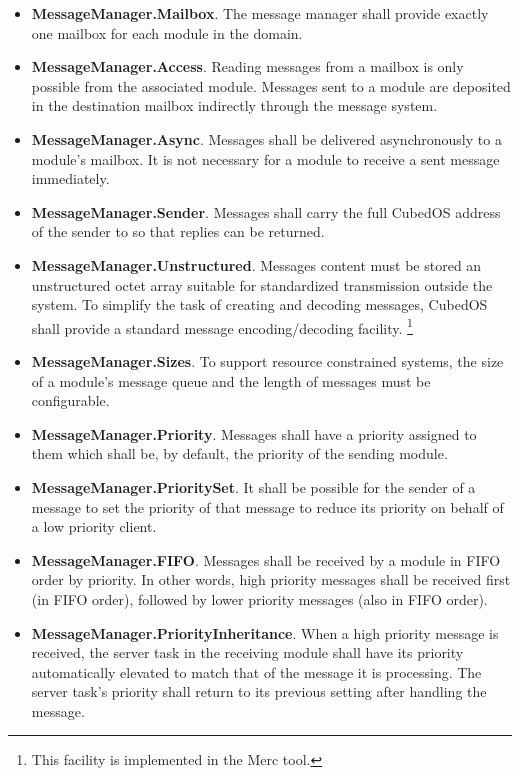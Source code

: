 \begin{itemize}
\item \textbf{MessageManager.Mailbox}. The message manager shall provide exactly one mailbox for
  each module in the domain.
\item \textbf{MessageManager.Access}. Reading messages from a mailbox is only possible from the associated module. Messages sent to a module are deposited in the destination mailbox indirectly through the message system.
\item \textbf{MessageManager.Async}. Messages shall be delivered asynchronously to a module's
  mailbox. It is not necessary for a module to receive a sent message immediately.
\item \textbf{MessageManager.Sender}. Messages shall carry the full CubedOS address of the
  sender to so that replies can be returned.
\item \textbf{MessageManager.Unstructured}. Messages content must be stored an unstructured octet array suitable for standardized transmission outside the system. To simplify the task of creating and
  decoding messages, CubedOS shall provide a standard message encoding/decoding facility.
  \footnote{This facility is implemented in the Merc tool.}
\item \textbf{MessageManager.Sizes}. To support resource constrained systems, the size of a module's message queue and the length of messages must be configurable.
\item \textbf{MessageManager.Priority}. Messages shall have a priority assigned to them which
  shall be, by default, the priority of the sending module.
\item \textbf{MessageManager.PrioritySet}. It shall be possible for the sender of a message to
  set the priority of that message to reduce its priority on behalf of a low priority client.
\item \textbf{MessageManager.FIFO}. Messages shall be received by a module in FIFO order by
  priority. In other words, high priority messages shall be received first (in FIFO order),
  followed by lower priority messages (also in FIFO order).
\item \textbf{MessageManager.PriorityInheritance}. When a high priority message is received, the
  server task in the receiving module shall have its priority automatically elevated to match
  that of the message it is processing. The server task's priority shall return to its previous
  setting after handling the message. 

\end{itemize}
